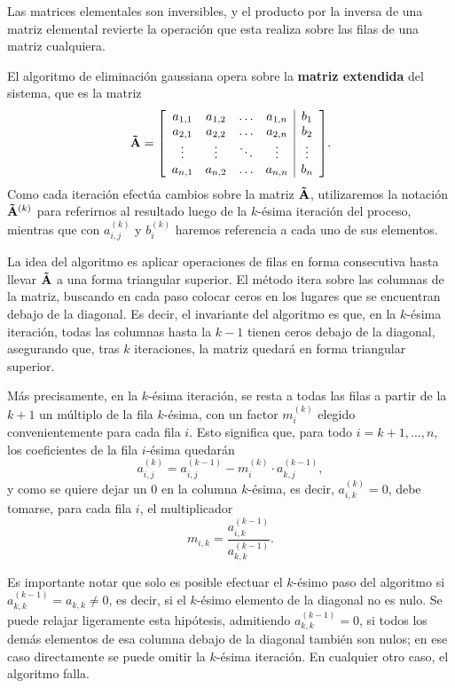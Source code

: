 Las matrices elementales son inversibles, y el producto por la inversa de una
matriz elemental revierte la operación que esta realiza sobre las filas de una
matriz cualquiera.

El algoritmo de eliminación gaussiana opera sobre la \textbf{matriz extendida}
del sistema, que es la matriz
\[ \mat{\tilde A} = \mleft[ \begin{array}{cccc|c}
    a_{1,1} & a_{1,2} & \dots  & a_{1,n} & b_{1} \\
    a_{2,1} & a_{2,2} & \dots  & a_{2,n} & b_{2} \\
    \vdots  & \vdots  & \ddots & \vdots  & \vdots \\
    a_{n,1} & a_{n,2} & \dots  & a_{n,n} & b_{n} \\
\end{array} \mright]. \]
Como cada iteración efectúa cambios sobre la matriz $\mathbf{\tilde A}$,
utilizaremos la notación $\mathbf{\tilde A}^{(k)}$ para referirnos al resultado
luego de la $k$-ésima iteración del proceso, mientras que con $a^{(k)}_{i,j}$
y $b^{(k)}_i$ haremos referencia a cada uno de sus elementos.

La idea del algoritmo es aplicar operaciones de filas en forma consecutiva
hasta llevar $\mathbf{\tilde A}$ a una forma triangular superior. El método itera
sobre las columnas de la matriz, buscando en cada paso colocar ceros en los
lugares que se encuentran debajo de la diagonal. Es decir, el invariante del
algoritmo es que, en la $k$-ésima iteración, todas las columnas hasta la $k -
1$ tienen ceros debajo de la diagonal, asegurando que, tras $k$ iteraciones,
la matriz quedará en forma triangular superior.

Más precisamente, en la $k$-ésima iteración, se resta a todas las filas a
partir de la $k + 1$ un múltiplo de la fila $k$-ésima, con un factor
$m^{(k)}_i$ elegido convenientemente para cada fila $i$. Esto significa que,
para todo $i = k+1,\dots,n$, los coeficientes de la fila $i$-ésima quedarán
\[ a^{(k)}_{i,j} = a^{(k-1)}_{i,j} - m^{(k)}_i \cdot a^{(k-1)}_{k,j}, \]
y como se quiere dejar un $0$ en la columna $k$-ésima, es decir,
$a^{(k)}_{i,k} = 0$, debe tomarse, para cada fila $i$, el multiplicador
\[ m_{i,k} = \frac{a^{(k-1)}_{i,k}}{a^{(k-1)}_{k,k}}. \]

Es importante notar que solo es posible efectuar el $k$-ésimo paso del
algoritmo si $a^{(k-1)}_{k,k} = a_{k,k} \neq 0$, es decir, si el $k$-ésimo
elemento de la diagonal no es nulo. Se puede relajar ligeramente esta
hipótesis, admitiendo $a^{(k-1)}_{k,k} = 0$, si todos los demás elementos
de esa columna debajo de la diagonal también son nulos; en ese caso
directamente se puede omitir la $k$-ésima iteración. En cualquier otro caso,
el algoritmo falla.

